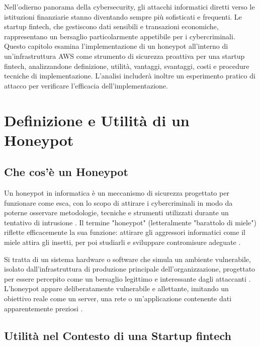 Nell'odierno panorama della cybersecurity, gli attacchi informatici diretti verso le istituzioni finanziarie stanno diventando sempre più sofisticati e frequenti. Le startup fintech, che gestiscono dati sensibili e transazioni economiche, rappresentano un bersaglio particolarmente appetibile per i cybercriminali. Questo capitolo esamina l'implementazione di un honeypot all'interno di un'infrastruttura AWS come strumento di sicurezza proattiva per una startup fintech, analizzandone definizione, utilità, vantaggi, svantaggi, costi e procedure tecniche di implementazione. L'analisi includerà inoltre un esperimento pratico di attacco per verificare l'efficacia dell'implementazione.

\section{Definizione e Utilità di un Honeypot}
\label{sec:def_utilita}

\subsection{Che cos'è un Honeypot}
\label{subsec:cos_e_honeypot}

Un honeypot in informatica è un meccanismo di sicurezza progettato per funzionare come esca, con lo scopo di attirare i cybercriminali in modo da poterne osservare metodologie, tecniche e strumenti utilizzati durante un tentativo di intrusione \cite{proofpoint2024}. Il termine "honeypot" (letteralmente "barattolo di miele") riflette efficacemente la sua funzione: attirare gli aggressori informatici come il miele attira gli insetti, per poi studiarli e sviluppare contromisure adeguate \cite{universeit2021}.

Si tratta di un sistema hardware o software che simula un ambiente vulnerabile, isolato dall'infrastruttura di produzione principale dell'organizzazione, progettato per essere percepito come un bersaglio legittimo e interessante dagli attaccanti \cite{insic2023, perego_2023}. L'honeypot appare deliberatamente vulnerabile e allettante, imitando un obiettivo reale come un server, una rete o un'applicazione contenente dati apparentemente preziosi \cite{proofpoint2024, vienažindytė_2020}.

\subsection{Utilità nel Contesto di una Startup fintech}
\label{subsec:utilita_fintech}

